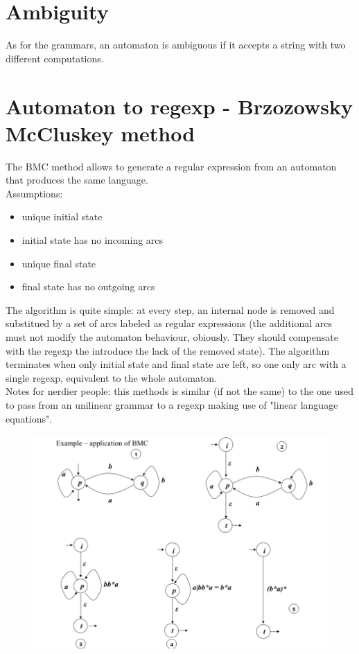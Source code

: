 	\section{Ambiguity}
		As for the grammars, an automaton is ambiguous if it accepts a string with two different computations. 
	
	\section{Automaton to regexp - Brzozowsky McCluskey method}
		The BMC method allows to generate a regular expression from an automaton that produces the same language.\\
		Assumptions:
		\begin{itemize}
			\item unique initial state
			\item initial state has no incoming arcs
			\item unique final state
			\item final state has no outgoing arcs
		\end{itemize}
		The algorithm is quite simple: at every step, an internal node is removed and substitued by a set of arcs labeled as regular expressions (the additional arcs must not modify the automaton behaviour, obiously. They should compensate with the regexp the introduce the lack of the removed state). The algorithm terminates when only initial state and final state are left, so one only arc with a single regexp, equivalent to the whole automaton.\\
		Notes for nerdier people: this methods is similar (if not the same) to the one used to pass from an unilinear grammar to a regexp making use of "linear language equations".
		\begin{figure}[htp]
			\begin{center}
			    \includegraphics[width = \textwidth]{./images/BMCMethod.png}
			\end{center}
		\end{figure}
	
